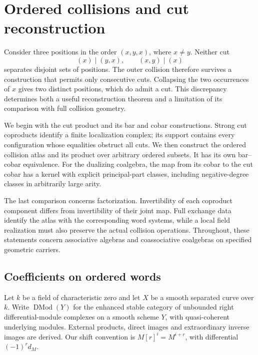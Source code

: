 \chapter{Ordered collisions and cut reconstruction}
\label{cycuts:ch}
\begingroup
\def\DMod{\operatorname{DMod}}
\def\RHom{R\operatorname{Hom}}
\def\W{\mathcal W_X}
\def\C{\mathcal C_X}
\def\cut{\star_{\mathrm{cut}}}
\def\Bcut{B_{\mathrm{cut}}}
\def\Ocut{\Omega_{\mathrm{cut}}}

Consider three positions in the order $(x,y,x)$, where $x\ne y$.
Neither cut
\[
 (x)\mid(y,x),\qquad (x,y)\mid(x)
\]
separates disjoint sets of positions. The outer collision therefore
survives a construction that permits only consecutive cuts. Collapsing
the two occurrences of $x$ gives two distinct positions, which do admit
a cut. This discrepancy determines both a useful reconstruction theorem
and a limitation of its comparison with full collision geometry.

We begin with the cut product and its bar and cobar constructions.
Strong cut coproducts identify a finite localization complex; its support
contains every configuration whose equalities obstruct all cuts. We then
construct the ordered collision atlas and its product over arbitrary
ordered subsets. It has its own bar--cobar equivalence. For the dualizing
coalgebra, the map from its cobar to the cut cobar has a kernel with
explicit principal-part classes, including negative-degree classes in
arbitrarily large arity.

The last comparison concerns factorization. Invertibility of each
coproduct component differs from invertibility of their joint map.
Full exchange data identify the atlas with the corresponding word
systems, while a local field realization must also preserve the actual
collision operations. Throughout, these statements concern associative
algebras and coassociative coalgebras on specified geometric carriers.

\section{Coefficients on ordered words}
\label{cycuts:sec:words}

Let $k$ be a field of characteristic zero and let $X$ be a smooth
separated curve over $k$. Write $\DMod(Y)$ for the enhanced stable
category of unbounded right differential-module complexes on a smooth
scheme $Y$, with quasi-coherent underlying modules. External products,
direct images and extraordinary inverse images are derived. Our shift
convention is $M[r]^i=M^{i+r}$, with differential $(-1)^r d_M$.

